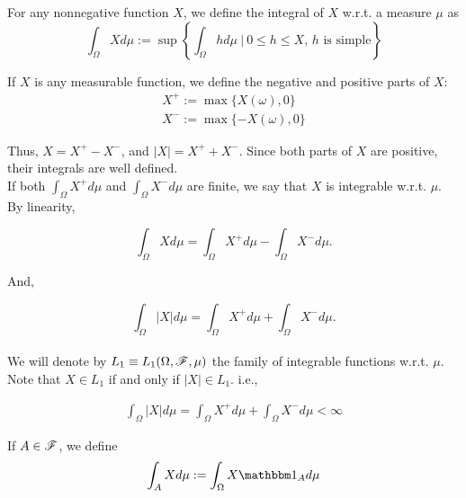\documentclass[../TGMAFFIRO.tex]{subfiles}
\begin{document}
\begin{definition}
	For any nonnegative function $X$, we define the integral of $X$ w.r.t. a measure $\mu$ as
	\begin{equation}
		\int_\Omega Xd\mu := \sup\left\{\int_\Omega h d\mu \ | \ 0 \leq h \leq X \text{, $h$ is simple}\right\}
	\end{equation}
\end{definition}

If $X$ is any measurable function, we define the negative and positive parts of $X$:
\begin{align}
	X^+ := \max\{X(\omega), 0\} \\
	X^- := \max\{-X(\omega), 0\}
\end{align}

Thus, $X = X^+ - X^-$, and $|X| = X^+ + X^-$. Since both parts of $X$ are positive, their integrals are well defined.\\

If both $\int_\Omega X^+ d\mu$ and $\int_\Omega X^- d\mu$ are finite, we say that $X$ is integrable w.r.t. $\mu$. By linearity, 

\begin{equation}
	\int_\Omega X d\mu = \int_\Omega X^+ d\mu - \int_\Omega X^- d\mu.
\end{equation}

And,

\begin{equation}
	\int_\Omega |X| d\mu = \int_\Omega X^+ d\mu + \int_\Omega X^- d\mu.
\end{equation} \\

We will denote by $L_1 \equiv L_1(\Omega, \mathscr{F}, \mu)$ the family of integrable functions w.r.t. $\mu$. Note that $X \in L_1$ if and only if $|X| \in L_1$. i.e.,

\begin{align}
	\int_\Omega |X| d\mu = \int_\Omega X^+ d\mu + \int_\Omega X^- d\mu < \infty
\end{align}

If $A \in \mathscr{F}$, we define
\begin{equation}
	\int_A X d\mu := \int_\Omega X \ind_A d\mu
\end{equation}

\end{document}
